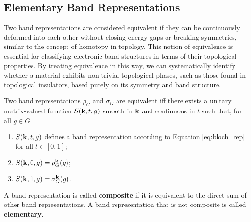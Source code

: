 \documentclass[12pt]{report}
\begin{document}
\subsection{Elementary Band Representations} \label{subsec:elementary_band_reps}

Two band representations are considered equivalent if they can be continuously deformed into each other without closing energy gaps or breaking symmetries, similar to the concept of homotopy in topology. This notion of equivalence is essential for classifying electronic band structures in terms of their topological properties. By treating equivalence in this way, we can systematically identify whether a material exhibits non-trivial topological phases, such as those found in topological insulators, based purely on its symmetry and band structure.

\begin{definition} \label{def:equiv_bandrep}
Two band representations $\rho_G$ and $\sigma_G$ are equivalent iff there exists a unitary matrix-valued function $S({\vb{k}},t,g)$ smooth in ${\vb{k}}$ and continuous in $t$ such that, for all $g \in G$
\begin{enumerate}
\item $S({\vb{k}}, t, g)$ defines a band representation according to Equation \ref{eq:bloch_rep} for all $t \in [0,1]$;
\item $S({\vb{k}}, 0, g) = \rho_G^{\vb{k}}(g)$;
\item $S({\vb{k}}, 1, g) = \sigma_G^{\vb{k}}(g)$.
\end{enumerate}
\end{definition}

\begin{definition}
A band representation is called \textbf{composite} if it is equivalent to the direct sum of other band representations. A band representation that is not composite is called \textbf{elementary}.
\end{definition}

%
\end{document}
